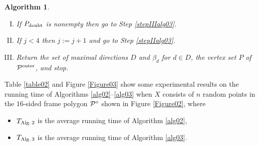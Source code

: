 \documentclass[12pt]{article}
\newtheorem{algorithm}{Algorithm}
\begin{document}
\begin{algorithm}
\begin{enumerate}[I.]
\item\label{stepIValg03} 
If $P_{\rm doubt}$ is nonempty then go to Step \ref{stepIIIalg03}.

\item\label{stepValg03} 
If $j < 4$ then $j := j+1$ and go to Step \ref{stepIIalg03}.

\item\label{stepVIalg03} 
Return the set of maximal directions $D$ and $\beta_d$ for $d \in D$, the vertex set $P$ of ${\cal P}^{\rm outer}$, and stop.
\end{enumerate}
\end{algorithm}



\medskip
Table \ref{table02} and Figure \ref{Figure03} show some experimental results on the running time of Algorithms \ref{alg02}--\ref{alg03} when $X$ consists of $n$ random points in the $16$-sided frame polygon ${\cal P}^\diamond$ shown in Figure \ref{Figure02}, where
\begin{itemize}
\item $T_{\rm Alg.\, 2}$ is the average running time of Algorithm \ref{alg02},
\item $T_{\rm Alg.\, 3}$ is the average running time of Algorithm \ref{alg03}.
\end{itemize}
\end{document}
